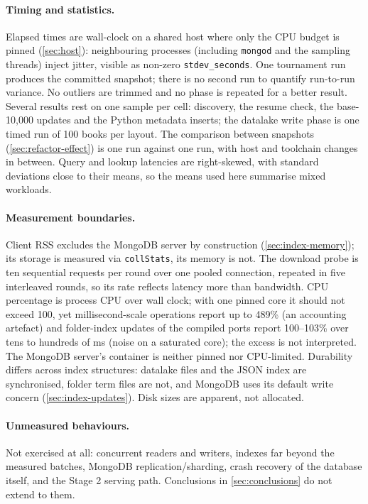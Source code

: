 \paragraph{Timing and statistics.}
Elapsed times are wall-clock on a shared host where only the CPU budget is
pinned (\cref{sec:host}): neighbouring
processes (including \texttt{mongod} and the sampling threads) inject
jitter, visible as non-zero \texttt{stdev\_seconds}. One tournament run
produces the committed snapshot; there is no second run to quantify
run-to-run variance. No outliers are trimmed and no phase is repeated for a
better result. Several results rest on one sample per cell: discovery, the
resume check, the base-10{,}000 updates and the Python metadata inserts; the
datalake write phase is one timed run of 100 books per layout. The
comparison between snapshots (\cref{sec:refactor-effect}) is one run against
one run, with host and toolchain changes in between. Query and lookup
latencies are right-skewed, with standard deviations close to their means,
so the means used here summarise mixed workloads.

\paragraph{Measurement boundaries.}
Client RSS excludes the MongoDB server by construction
(\cref{sec:index-memory}); its storage is measured via \texttt{collStats},
its memory is not. The download probe is ten sequential requests per round
over one pooled connection, repeated in five interleaved rounds, so its
rate reflects latency more than bandwidth. CPU percentage is process CPU
over wall clock; with one pinned core it should not exceed 100, yet
millisecond-scale operations report up to 489\% (an accounting artefact)
and folder-index updates of the compiled ports report 100--103\% over tens
to hundreds of ms (noise on a saturated core); the excess is not
interpreted. The MongoDB server's
container is neither pinned nor CPU-limited. Durability differs across index
structures: datalake files and the JSON index are synchronised, folder term
files are not, and MongoDB uses its default write concern
(\cref{sec:index-updates}). Disk sizes are apparent, not allocated.

\paragraph{Unmeasured behaviours.}
Not exercised at all: concurrent readers and writers, indexes far beyond the
measured batches, MongoDB replication/sharding, crash recovery of the
database itself, and the Stage 2 serving path. Conclusions in
\cref{sec:conclusions} do not extend to them.
